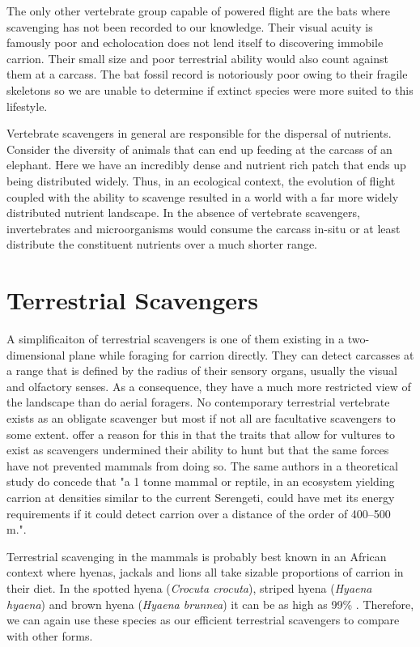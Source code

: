 \documentclass[a4paper,12pt]{article}
\begin{document}
The only other vertebrate group capable of powered flight are the bats where scavenging has not been recorded to our knowledge. Their visual acuity is famously poor and echolocation does not lend itself to discovering immobile carrion. Their small size and poor terrestrial ability would also count against them at a carcass. The bat fossil record is notoriously poor owing to their fragile skeletons so we are unable to determine if extinct species were more suited to this lifestyle. 

Vertebrate scavengers in general are responsible for the dispersal of nutrients. Consider the diversity of animals that can end up feeding at the carcass of an elephant. Here we have an incredibly dense and nutrient rich patch that ends up being distributed widely. Thus, in an ecological context, the evolution of flight coupled with the ability to scavenge resulted in a world with a far more widely distributed nutrient landscape. In the absence of vertebrate scavengers, invertebrates and microorganisms would consume the carcass in-situ or at least distribute the constituent nutrients over a much shorter range. 

\section*{Terrestrial Scavengers}
A simplificaiton of terrestrial scavengers is one of them existing in a two-dimensional plane while foraging for carrion directly. They can detect carcasses at a range that is defined by the radius of their sensory organs, usually the visual and olfactory senses. As a consequence, they have a much more restricted view of the landscape than do aerial foragers. No contemporary terrestrial vertebrate exists as an obligate scavenger but most if not all are facultative scavengers to some extent. \cite{ruxton2004obligate} offer a reason for this in that the traits that allow for vultures to exist as scavengers undermined their ability to hunt but that the same forces have not prevented mammals from doing so. The same authors in a theoretical study do concede that "a 1 tonne mammal or reptile, in an ecosystem yielding carrion at densities similar to the current Serengeti, could have met its energy requirements if it could detect carrion over a distance of the order of 400–500 m."\citep{ruxton2004obligate}. 

Terrestrial scavenging in the mammals is probably best known in an African context where hyenas, jackals and lions all take sizable proportions of carrion in their diet. In the spotted hyena (\textit{Crocuta crocuta}), striped hyena (\textit{Hyaena hyaena}) and brown hyena (\textit{Hyaena brunnea}) it can be as high as 99\% \citep{benbow2015introduction}. Therefore, we can again use these species as our efficient terrestrial scavengers to compare with other forms. 
\end{document}
